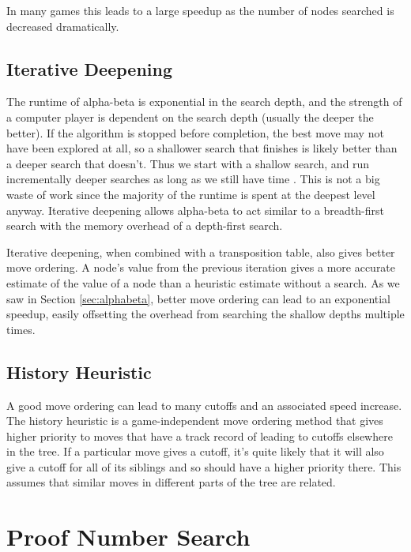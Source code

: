 In many games this leads to a large speedup as the number of nodes searched is decreased dramatically.


\subsection{Iterative Deepening}

The runtime of alpha-beta is exponential in the search depth, and the strength of a computer player is dependent on the search depth (usually the deeper the better). If the algorithm is stopped before completion, the best move may not have been explored at all, so a shallower search that finishes is likely better than a deeper search that doesn't. Thus we start with a shallow search, and run incrementally deeper searches as long as we still have time \cite{slate1977chess}. This is not a big waste of work since the majority of the runtime is spent at the deepest level anyway. Iterative deepening allows alpha-beta to act similar to a breadth-first search with the memory overhead of a depth-first search.

Iterative deepening, when combined with a transposition table, also gives better move ordering. A node's value from the previous iteration gives a more accurate estimate of the value of a node than a heuristic estimate without a search. As we saw in Section \ref{sec:alphabeta}, better move ordering can lead to an exponential speedup, easily offsetting the overhead from searching the shallow depths multiple times.

\subsection{History Heuristic}

A good move ordering can lead to many cutoffs and an associated speed increase. The history heuristic \cite{schaeffer1989history} is a game-independent move ordering method that gives higher priority to moves that have a track record of leading to cutoffs elsewhere in the tree. If a particular move gives a cutoff, it's quite likely that it will also give a cutoff for all of its siblings and so should have a higher priority there. This assumes that similar moves in different parts of the tree are related.




\section{Proof Number Search} \label{sec:PNS}

